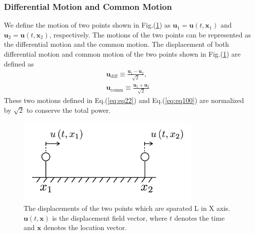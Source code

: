 \subsubsection{Differential Motion and Common Motion}
We define the motion of two points shown in Fig.(\ref{img:img310}) as $\bm{u}_1=\bm{u}(t,\bm{x}_1)$ and $\bm{u}_2=\bm{u}(t,\bm{x}_2)$, respectively. The motions of the two points can be represented as the differential motion and the common motion. The displacement of both differential motion and common motion of the two points shown in Fig.(\ref{img:img310}) are defined as
\begin{eqnarray}
  \bm{u}_{\mathrm{diff}} \equiv \frac{\bm{u}_{1}-\bm{u}_{2}}{\sqrt{2}}, \, \\ \label{eq:eq22}
  \bm{u}_{\mathrm{comm}}  \equiv \frac{\bm{u}_{1}+\bm{u}_{2}}{\sqrt{2}} \label{eq:eq100}
\end{eqnarray}
These two motions defined in Eq.(\ref{eq:eq22}) and Eq.(\ref{eq:eq100}) are normalized by $\sqrt{2}$ to conserve the total power.
\begin{figure}[h]
  \begin{center}
    \includegraphics[width=9.0cm]{./img_chap3/img315.png}
    \caption{The displacements of the two points which are sparated L in X axis. $\bm{u}(t,\bm{x})$ is the displacement field vector, where $t$ denotes the time and $\bm{x}$ denotes the location vector.}\label{img:img310}    
  \end{center}
\end{figure}



